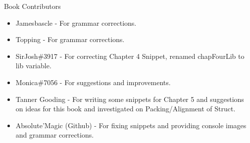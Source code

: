 \large Book Contributors \newline
\begin{itemize}
	\item Jamesbascle - For grammar corrections.
	\item Topping - For grammar corrections.
	\item SirJosh\#3917 - For correcting Chapter 4 Snippet, renamed chapFourLib to lib variable.
	\item Monica\#7056 - For suggestions and improvements.
	\item Tanner Gooding - For writing some snippets for Chapter 5 and suggestions on ideas for this book and investigated on Packing/Alignment of Struct.
	\item Absolute'Magic (Github) - For fixing snippets and providing console images and grammar corrections.
\end{itemize}

\newpage

